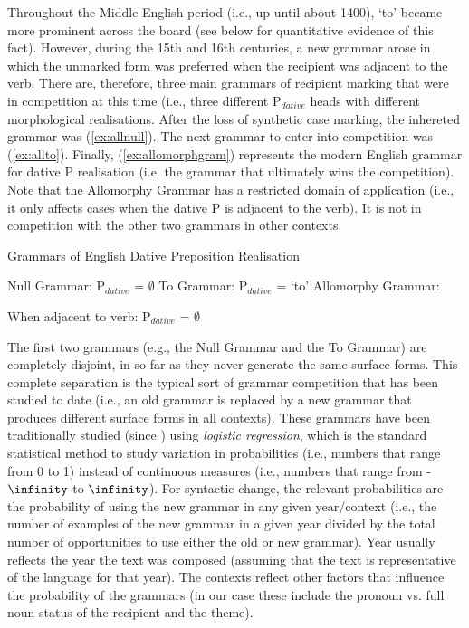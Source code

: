 	Throughout the Middle English period (i.e., up until about 1400), `to' became more prominent across the board (see below for quantitative evidence of this fact). However, during the 15th and 16th centuries, a new grammar arose in which the unmarked form was preferred when the recipient was adjacent to the verb. There are, therefore, three main grammars of recipient marking that were in competition at this time (i.e., three different P$_{dative}$ heads with different morphological realisations. After the loss of synthetic case marking, the inhereted grammar was (\ref{ex:allnull}). The next grammar to enter into competition was (\ref{ex:allto}). Finally, (\ref{ex:allomorphgram}) represents the modern English grammar for dative P realisation (i.e. the grammar that ultimately wins the competition). Note that the Allomorphy Grammar has a restricted domain of application (i.e., it only affects cases when the dative P is adjacent to the verb). It is not in competition with the other two grammars in other contexts.

	\begin{exe}
		\ex Grammars of English Dative Preposition Realisation
		\begin{xlist}
			\ex Null Grammar: P$_{dative}$ = $\emptyset$ \label{ex:allnull}
			\ex To Grammar: P$_{dative}$ = `to' \label{ex:allto}
			\ex Allomorphy Grammar: \label{ex:allomorphgram}
			\begin{itemize}
				\ex When adjacent to verb: P$_{dative}$ = $\emptyset$
			\end{itemize}
		\end{xlist}
	\end{exe}

	The first two grammars (e.g., the Null Grammar and the To Grammar) are completely disjoint, in so far as they never generate the same surface forms. This complete separation is the typical sort of grammar competition that has been studied to date (i.e., an old grammar is replaced by a new grammar that produces different surface forms in all contexts). These grammars have been traditionally studied (since \citealt{Kroch.1989}) using \textit{logistic regression}, which is the standard statistical method to study variation in probabilities (i.e., numbers that range from 0 to 1) instead of continuous measures (i.e., numbers that range from -$\infinity$ to $\infinity$). For syntactic change, the relevant probabilities are the probability of using the new grammar in any given year/context (i.e., the number of examples of the new grammar in a given year divided by the total number of opportunities to use either the old or new grammar). Year usually reflects the year the text was composed (assuming that the text is representative of the language for that year). The contexts reflect other factors that influence the probability of the grammars (in our case these include the pronoun vs. full noun status of the recipient and the theme).

